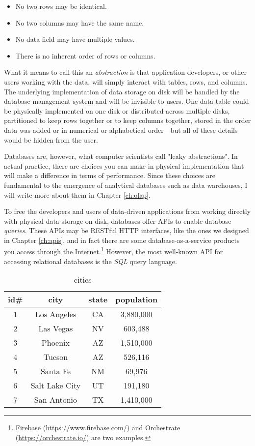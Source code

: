 \documentclass[11pt]{book}
\newcommand{\term}[1]{\emph{#1}} %
\newcommand{\head}[1]{\textnormal{\textbf{#1}}} %
\begin{document}
\begin{itemize}
    \item No two rows may be identical.
    \item No two columns may have the same name.
    \item No data field may have multiple values.
    \item There is no inherent order of rows or columns.
\end{itemize}

What it means to call this an \term{abstraction} is that application developers, or other users working with the data, will simply interact with tables, rows, and columns.  The underlying implementation of data storage on disk will be handled by the database management system and will be invisible to users.  One data table could be physically implemented on one disk or distributed across multiple disks, partitioned to keep rows together or to keep columns together, stored in the order data was added or in numerical or alphabetical order---but all of these details would be hidden from the user.

Databases are, however, what computer scientists call "leaky abstractions".  In actual practice, there are choices you can make in physical implementation that will make a difference in terms of performance.  Since these choices are fundamental to the emergence of analytical databases such as data warehouses, I will write more about them in Chapter \ref{ch:olap}.

To free the developers and users of data-driven applications from working directly with physical data storage on disk, databases offer APIs to enable database \term{queries}.  These APIs may be RESTful HTTP interfaces, like the ones we designed in Chapter \ref{ch:apis}, and in fact there are some database-as-a-service products you access through the Internet.\footnote{Firebase (\url{https://www.firebase.com/}) and Orchestrate (\url{https://orchestrate.io/}) are two examples.}  However, the most well-known API for accessing relational databases is the \term{SQL} query language.

\begin{table}
\centering
\caption{cities}\label{tab:cities}
\vspace{10pt}
\begin{tabular}{cccc}
    \toprule[1.5pt]
    \head{id\#} & \head{city} & \head{state} & \head{population}\\
    \midrule
    1 & Los Angeles & CA & 3,880,000\\
    2 & Las Vegas & NV & 603,488\\
    3 & Phoenix & AZ & 1,510,000\\
    4 & Tucson & AZ & 526,116\\
    5 & Santa Fe & NM & 69,976\\
    6 & Salt Lake City & UT & 191,180\\
    7 & San Antonio & TX & 1,410,000\\
    \bottomrule[1.5pt]
\end{tabular}
\end{table}
\end{document}
